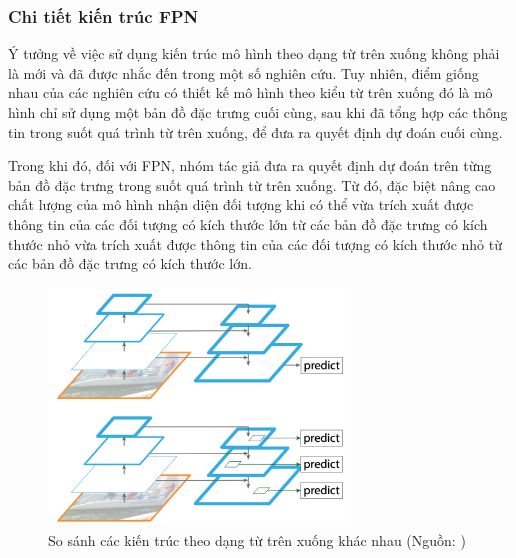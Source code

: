 {    \subsubsection*{Chi tiết kiến trúc FPN}
    Ý tưởng về việc sử dụng kiến trúc mô hình theo dạng từ trên xuống không phải là mới và đã được nhắc đến trong một số nghiên cứu. Tuy nhiên, điểm giống nhau của các nghiên cứu có thiết kế mô hình theo kiểu từ trên xuống đó là mô hình chỉ sử dụng một bản đồ đặc trưng cuối cùng, sau khi đã tổng hợp các thông tin trong suốt quá trình từ trên xuống, để đưa ra quyết định dự đoán cuối cùng.

    \noindent
    Trong khi đó, đối với FPN, nhóm tác giả đưa ra quyết định dự đoán trên từng bản đồ đặc trưng trong suốt quá trình từ trên xuống. Từ đó, đặc biệt nâng cao chất lượng của mô hình nhận diện đối tượng khi có thể vừa trích xuất được thông tin của các đối tượng có kích thước lớn từ các bản đồ đặc trưng có kích thước nhỏ vừa trích xuất được thông tin của các đối tượng có kích thước nhỏ từ các bản đồ đặc trưng có kích thước lớn.

    \begin{figure}[H]
        \centering
        \includegraphics[width=8cm] {images/fpn_topdown}
        \caption{So sánh các kiến trúc theo dạng từ trên xuống khác nhau (Nguồn: \cite{lin2017feature})}
        \label{fig:fpn_topdown}
    \end{figure}

}
